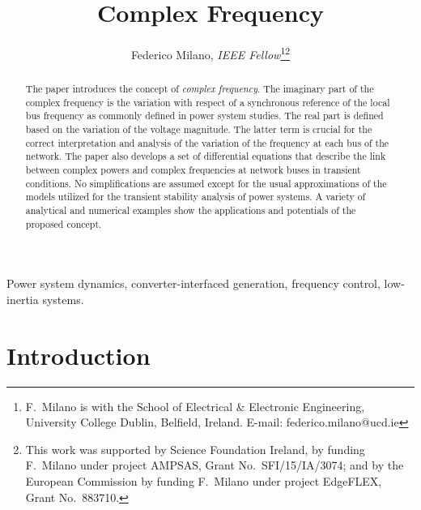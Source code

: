 \documentclass[journal, twocolumn, letter]{IEEEtran}
\begin{document}
\title{Complex Frequency}
\author{Federico Milano, {\em IEEE Fellow}\thanks{F.~Milano is with the School of Electrical \& Electronic
    Engineering, University College Dublin, Belfield, Ireland.
    E-mail: federico.milano@ucd.ie}\thanks{This work was supported by Science Foundation Ireland, by
    funding F.~Milano under project AMPSAS, Grant No.~SFI/15/IA/3074;
    and by the European Commission by funding F.~Milano under project
    EdgeFLEX, Grant No.~883710.}}

\maketitle

\begin{abstract}
  The paper introduces the concept of \textit{complex frequency}.  The
  imaginary part of the complex frequency is the variation with
  respect of a synchronous reference of the local bus frequency as
  commonly defined in power system studies.  The real part is defined
  based on the variation of the voltage magnitude.  The latter term is
  crucial for the correct interpretation and analysis of the variation
  of the frequency at each bus of the network.  The paper also
  develops a set of differential equations that describe the link
  between complex powers and complex frequencies at network buses in
  transient conditions.  No simplifications are assumed except for
   the usual approximations of the models utilized for the
  transient stability analysis of power systems.   A
  variety of analytical and numerical examples show the applications
  and potentials of the proposed concept.
\end{abstract}

\begin{keywords}
  Power system dynamics, converter-interfaced generation, frequency
  control, low-inertia systems.
\end{keywords}

\section{Introduction}
\label{sec:intr}
\end{document}
